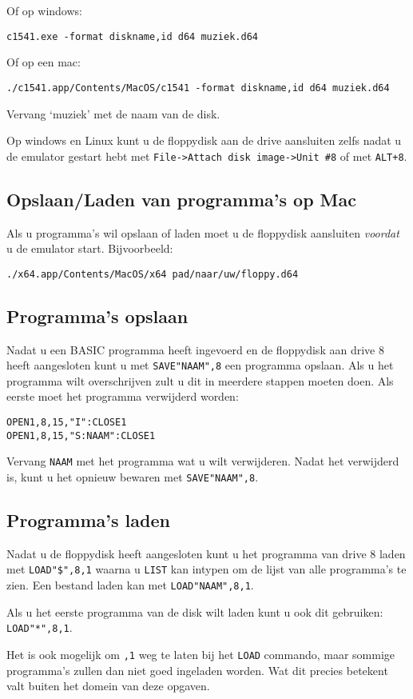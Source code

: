 Of op windows:

\begin{lstlisting}
c1541.exe -format diskname,id d64 muziek.d64
\end{lstlisting}

Of op een mac:

\begin{lstlisting}
./c1541.app/Contents/MacOS/c1541 -format diskname,id d64 muziek.d64
\end{lstlisting}

Vervang `muziek' met de naam van de disk.

Op windows en Linux kunt u de floppydisk aan de drive aansluiten zelfs nadat u de emulator gestart hebt met \verb:File->Attach disk image->Unit #8: of met \verb:ALT+8:.

\subsection{Opslaan/Laden van programma's op Mac}

Als u programma's wil opslaan of laden moet u de floppydisk aansluiten \emph{voordat} u de emulator start. Bijvoorbeeld:

\begin{lstlisting}
./x64.app/Contents/MacOS/x64 pad/naar/uw/floppy.d64
\end{lstlisting}

\subsection{Programma's opslaan}

Nadat u een BASIC programma heeft ingevoerd en de floppydisk aan drive 8 heeft aangesloten kunt u met \verb:SAVE"NAAM",8: een programma opslaan.
Als u het programma wilt overschrijven zult u dit in meerdere stappen moeten doen.
Als eerste moet het programma verwijderd worden:

\begin{lstlisting}
OPEN1,8,15,"I":CLOSE1
OPEN1,8,15,"S:NAAM":CLOSE1
\end{lstlisting}

Vervang \verb:NAAM: met het programma wat u wilt verwijderen.
Nadat het verwijderd is, kunt u het opnieuw bewaren met \verb:SAVE"NAAM",8:.

\subsection{Programma's laden}

Nadat u de floppydisk heeft aangesloten kunt u het programma van drive 8 laden met \verb:LOAD"$",8,1: waarna u \verb:LIST: kan intypen om de lijst van alle programma's te zien.
Een bestand laden kan met \verb:LOAD"NAAM",8,1:.

Als u het eerste programma van de disk wilt laden kunt u ook dit gebruiken: \verb:LOAD"*",8,1:.

Het is ook mogelijk om \verb:,1: weg te laten bij het \verb:LOAD: commando, maar sommige programma's zullen dan niet goed ingeladen worden.
Wat dit precies betekent valt buiten het domein van deze opgaven.
